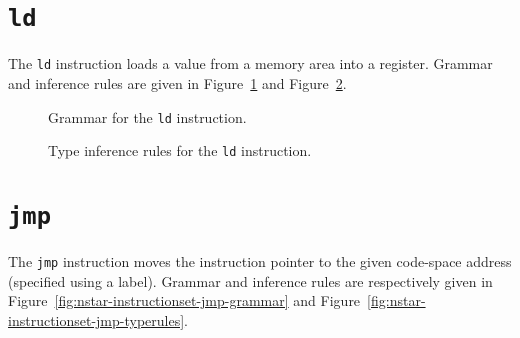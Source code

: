 \section{\texttt{ld}}\label{sec:nstar-instructionset-ld}

The \texttt{ld} instruction loads a value from a memory area into a register.
Grammar and inference rules are given in Figure~\ref{fig:nstar-instructionset-ld-grammar} and Figure~\ref{fig:nstar-instructionset-ld-typerules}.

\begin{figure}[H]
  \centering


  \caption{Grammar for the \texttt{ld} instruction.}
  \label{fig:nstar-instructionset-ld-grammar}
\end{figure}

\begin{figure}[H]
  \centering


  \caption{Type inference rules for the \texttt{ld} instruction.}
  \label{fig:nstar-instructionset-ld-typerules}
\end{figure}

\section{\texttt{jmp}}\label{sec:nstar-instructionset-jmp}

The \texttt{jmp} instruction moves the instruction pointer to the given code-space address (specified using a label).
Grammar and inference rules are respectively given in Figure~\ref{fig:nstar-instructionset-jmp-grammar} and Figure~\ref{fig:nstar-instructionset-jmp-typerules}.

